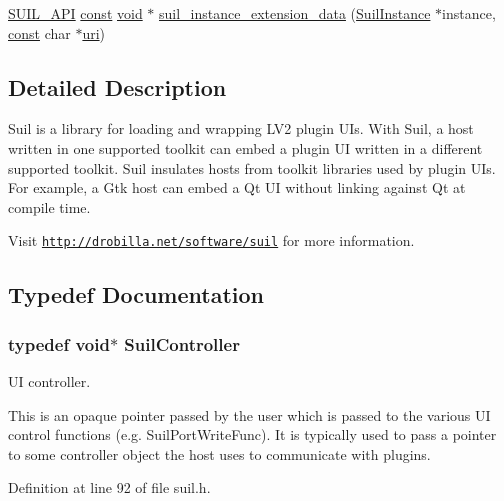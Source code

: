 \begin{DoxyCompactItemize}
\item 
\hyperlink{suil_8h_a471ed687e8f67356d9926abaa1b9e2eb}{S\+U\+I\+L\+\_\+\+A\+PI} \hyperlink{getopt1_8c_a2c212835823e3c54a8ab6d95c652660e}{const} \hyperlink{sound_8c_ae35f5844602719cf66324f4de2a658b3}{void} $\ast$ \hyperlink{group__suil_ga7edf0fffbe14840d78c27a8b06a612c9}{suil\+\_\+instance\+\_\+extension\+\_\+data} (\hyperlink{group__suil_ga767e978a8c5f7c0d5246da79c9b97c6b}{Suil\+Instance} $\ast$instance, \hyperlink{getopt1_8c_a2c212835823e3c54a8ab6d95c652660e}{const} char $\ast$\hyperlink{lib_2expat_8h_a5a9fdd6c2606370ad12f24c078ac6585}{uri})
\end{DoxyCompactItemize}


\subsection{Detailed Description}
Suil is a library for loading and wrapping L\+V2 plugin U\+Is. With Suil, a host written in one supported toolkit can embed a plugin UI written in a different supported toolkit. Suil insulates hosts from toolkit libraries used by plugin U\+Is. For example, a Gtk host can embed a Qt UI without linking against Qt at compile time.

Visit \href{http://drobilla.net/software/suil}{\tt http\+://drobilla.\+net/software/suil} for more information. 

\subsection{Typedef Documentation}
\subsubsection[{\texorpdfstring{Suil\+Controller}{SuilController}}]{\setlength{\rightskip}{0pt plus 5cm}typedef {\bf void}$\ast$ {\bf Suil\+Controller}}\hypertarget{group__suil_gad056063f5a1fafbb2ae1354edf16c21a}{}\label{group__suil_gad056063f5a1fafbb2ae1354edf16c21a}
UI controller.

This is an opaque pointer passed by the user which is passed to the various UI control functions (e.\+g. Suil\+Port\+Write\+Func). It is typically used to pass a pointer to some controller object the host uses to communicate with plugins. 

Definition at line 92 of file suil.\+h.

